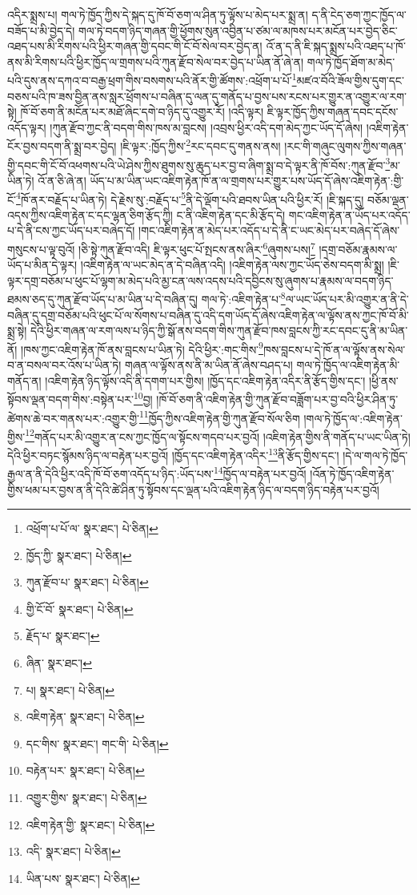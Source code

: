 འདིར་སྨྲས་པ། གལ་ཏེ་ཁྱོད་ཀྱིས་དེ་སྐད་དུ་ཁོ་བོ་ཅག་ལ་ཤིན་ཏུ་ལྟོས་པ་མེད་པར་སྨྲ་ན། ད་ནི་ངེད་ཅག་ཀྱང་ཁྱོད་ལ་བཟོད་པ་མི་བྱེད་དེ། གལ་ཏེ་བདག་ཉིད་གཞན་གྱི་ཕྱོགས་སུན་འབྱིན་པ་ཙམ་ལ་མཁས་པར་མངོན་པར་བྱེད་ཅིང་འཐད་པས་མི་རིགས་པའི་ཕྱིར་གཞན་གྱི་དབང་གི་ངོ་བོ་སེལ་བར་བྱེད་ན། འོ་ན་ད་ནི་ཇི་སྐད་སྨྲས་པའི་འཐད་པ་ཁོ་ནས་མི་རིགས་པའི་ཕྱིར་ཁྱོད་ལ་གྲགས་པའི་ཀུན་རྫོབ་སེལ་བར་བྱེད་པ་ཡིན་ནོ་ཞེ་ན། གལ་ཏེ་ཁྱོད་ཐོག་མ་མེད་པའི་དུས་ནས་དཀའ་བ་བརྒྱ་ཕྲག་གིས་བསགས་པའི་ནོར་གྱི་ཚོགས་:འཕྲོག་པ་པོ་\footnote{འཕྲོག་པ་པོ་ལ་  སྣར་ཐང་།  པེ་ཅིན། }མཛའ་བོའི་ཟོལ་གྱིས་དུག་དང་བཅས་པའི་ཁ་ཟས་བྱིན་ནས་སླར་ཕྲོགས་པ་བཞིན་དུ་ལན་དུ་གནོད་པ་བྱས་པས་རངས་པར་གྱུར་ན་འགྱུར་ལ་རག་སྟེ། ཁོ་བོ་ཅག་ནི་མངོན་པར་མཐོ་ཞིང་དགེ་བ་ཉིད་དུ་འགྱུར་རོ། །འདི་ལྟར། ཇི་ལྟར་ཁྱོད་ཀྱིས་གཞན་དབང་དངོས་འདོད་ལྟར། །ཀུན་རྫོབ་ཀྱང་ནི་བདག་གིས་ཁས་མ་བླངས། །འབྲས་ཕྱིར་འདི་དག་མེད་ཀྱང་ཡོད་དོ་ཞེས། །འཇིག་རྟེན་ངོར་བྱས་བདག་ནི་སྨྲ་བར་བྱེད། །ཇི་ལྟར་:ཁྱོད་ཀྱིས་\footnote{ཁྱོད་ཀྱི་  སྣར་ཐང་།  པེ་ཅིན། }རང་དབང་དུ་གནས་ནས། །རང་གི་གཞུང་ལུགས་ཀྱིས་གཞན་གྱི་དབང་གི་ངོ་བོ་འཕགས་པའི་ཡེ་ཤེས་ཀྱིས་ཐུགས་སུ་ཆུད་པར་བྱ་བ་ཞིག་སྨྲ་བ་དེ་ལྟར་ནི་ཁོ་བོས་:ཀུན་རྫོབ་\footnote{ཀུན་རྫོབ་པ་  སྣར་ཐང་།  པེ་ཅིན། }མ་ཡིན་ཏེ། འོ་ན་ཅི་ཞེ་ན། ཡོད་པ་མ་ཡིན་ཡང་འཇིག་རྟེན་ཁོ་ན་ལ་གྲགས་པར་གྱུར་པས་ཡོད་དོ་ཞེས་འཇིག་རྟེན་:གྱི་ངོ་\footnote{གྱི་ངོ་བོ་  སྣར་ཐང་།  པེ་ཅིན། }ཁོ་ནར་བརྗོད་པ་ཡིན་ཏེ། དེ་རྗེས་སུ་:བརྗོད་པ་\footnote{རྗོད་པ་  སྣར་ཐང་། }ནི་དེ་ལྡོག་པའི་ཐབས་ཡིན་པའི་ཕྱིར་རོ། །ཇི་སྐད་དུ། བཅོམ་ལྡན་འདས་ཀྱིས་འཇིག་རྟེན་ང་དང་ལྷན་ཅིག་རྩོད་ཀྱི། ང་ནི་འཇིག་རྟེན་དང་མི་རྩོད་དེ། གང་འཇིག་རྟེན་ན་ཡོད་པར་འདོད་པ་དེ་ནི་ངས་ཀྱང་ཡོད་པར་བཞེད་དོ། །གང་འཇིག་རྟེན་ན་མེད་པར་འདོད་པ་དེ་ནི་ང་ཡང་མེད་པར་བཞེད་དོ་ཞེས་གསུངས་པ་ལྟ་བུའོ། །ཅི་སྟེ་ཀུན་རྫོབ་འདི། ཇི་ལྟར་ཕུང་པོ་སྤངས་ནས་ཞིར་\footnote{ཞིན་  སྣར་ཐང་། }ཞུགས་པས།\footnote{པ།  སྣར་ཐང་།  པེ་ཅིན། } །དགྲ་བཅོམ་རྣམས་ལ་ཡོད་པ་མིན་དེ་ལྟར། །འཇིག་རྟེན་ལ་ཡང་མེད་ན་དེ་བཞིན་འདི། །འཇིག་རྟེན་ལས་ཀྱང་ཡོད་ཅེས་བདག་མི་སྨྲ། །ཇི་ལྟར་དགྲ་བཅོམ་པ་ཕུང་པོ་ལྷག་མ་མེད་པའི་མྱ་ངན་ལས་འདས་པའི་དབྱིངས་སུ་ཞུགས་པ་རྣམས་ལ་བདག་ཉིད་ཐམས་ཅད་དུ་ཀུན་རྫོབ་ཡོད་པ་མ་ཡིན་པ་དེ་བཞིན་དུ། གལ་ཏེ་:འཇིག་རྟེན་པ་\footnote{འཇིག་རྟེན་  སྣར་ཐང་།  པེ་ཅིན། }ལ་ཡང་ཡོད་པར་མི་འགྱུར་ན་ནི་དེ་བཞིན་དུ་དགྲ་བཅོམ་པའི་ཕུང་པོ་ལ་སོགས་པ་བཞིན་དུ་འདི་དག་ཡོད་དོ་ཞེས་འཇིག་རྟེན་ལ་ལྟོས་ནས་ཀྱང་ཁོ་བོ་མི་སྨྲ་སྟེ། དེའི་ཕྱིར་གཞན་ལ་རག་ལས་པ་ཉིད་ཀྱི་སྒོ་ནས་བདག་གིས་ཀུན་རྫོབ་ཁས་བླངས་ཀྱི་རང་དབང་དུ་ནི་མ་ཡིན་ནོ། །ཁས་ཀྱང་འཇིག་རྟེན་ཁོ་ནས་བླངས་པ་ཡིན་ཏེ། དེའི་ཕྱིར་:གང་གིས་\footnote{དང་གིས་  སྣར་ཐང་། གང་གི་  པེ་ཅིན། }ཁས་བླངས་པ་དེ་ཁོ་ན་ལ་ལྟོས་ནས་སེལ་བ་ན་བསལ་བར་འོས་པ་ཡིན་ཏེ། གཞན་ལ་ལྟོས་ནས་ནི་མ་ཡིན་ནོ་ཞེས་བཤད་པ། གལ་ཏེ་ཁྱོད་ལ་འཇིག་རྟེན་མི་གནོད་ན། །འཇིག་རྟེན་ཉིད་ལྟོས་འདི་ནི་དགག་པར་གྱིས། །ཁྱོད་དང་འཇིག་རྟེན་འདིར་ནི་རྩོད་གྱིས་དང་། །ཕྱི་ནས་སྟོབས་ལྡན་བདག་གིས་:བསྟེན་པར་\footnote{བརྟེན་པར་  སྣར་ཐང་།  པེ་ཅིན། }བྱ། །ཁོ་བོ་ཅག་ནི་འཇིག་རྟེན་གྱི་ཀུན་རྫོབ་བཟློག་པར་བྱ་བའི་ཕྱིར་ཤིན་ཏུ་ཚེགས་ཆེ་བར་གནས་པར་:འགྱུར་གྱི་\footnote{འགྱུར་གྱིས་  སྣར་ཐང་།  པེ་ཅིན། }ཁྱོད་ཀྱིས་འཇིག་རྟེན་གྱི་ཀུན་རྫོབ་སོལ་ཅིག །གལ་ཏེ་ཁྱོད་ལ་:འཇིག་རྟེན་གྱིས་\footnote{འཇིག་རྟེན་གྱི་  སྣར་ཐང་།  པེ་ཅིན། }གནོད་པར་མི་འགྱུར་ན་ངས་ཀྱང་ཁྱོད་ལ་སྟོངས་གདབ་པར་བྱའོ། །འཇིག་རྟེན་གྱིས་ནི་གནོད་པ་ཡང་ཡིན་ཏེ། དེའི་ཕྱིར་བཏང་སྙོམས་ཉིད་ལ་བརྟེན་པར་བྱའོ། །ཁྱོད་དང་འཇིག་རྟེན་འདིར་\footnote{འདི་  སྣར་ཐང་།  པེ་ཅིན། }ནི་རྩོད་གྱིས་དང་། །དེ་ལ་གལ་ཏེ་ཁྱོད་རྒྱལ་ན་ནི་དེའི་ཕྱིར་འདི་ཁོ་བོ་ཅག་འདོད་པ་ཉིད་:ཡོད་པས་\footnote{ཡིན་པས་  སྣར་ཐང་།  པེ་ཅིན། }ཁྱོད་ལ་བརྟེན་པར་བྱའོ། །འོན་ཏེ་ཁྱོད་འཇིག་རྟེན་གྱིས་ཕམ་པར་བྱས་ན་ནི་དེའི་ཚེ་ཤིན་ཏུ་སྟོབས་དང་ལྡན་པའི་འཇིག་རྟེན་ཉིད་ལ་བདག་ཉིད་བརྟེན་པར་བྱའོ། 